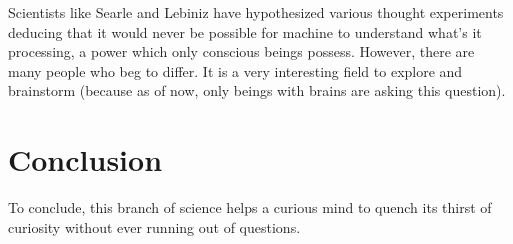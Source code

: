 \documentclass{article}
\begin{document}
Scientists like Searle and Lebiniz have hypothesized various thought experiments deducing that it would never be possible for machine to understand what's it processing, a power which only conscious beings possess. However, there are many people who beg to differ. It is a very interesting field to explore and brainstorm (because as of now, only beings with brains are asking this question).

\section{Conclusion}
To conclude, this branch of science helps a curious mind to quench its thirst of curiosity without ever running out of questions.
\end{document}
